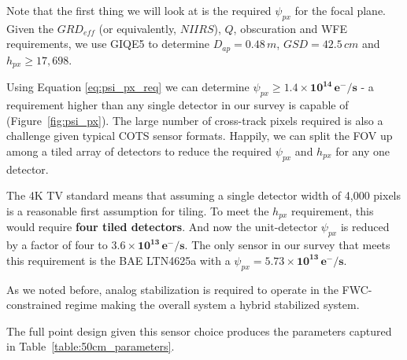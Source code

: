 \documentclass[]{spieman}  %
\begin{document}
Note that the first thing we will look at is the required $\psi_{px}$ for the focal plane.  Given the $GRD_{eff}$ (or equivalently, $NIIRS$), $Q$, obscuration and WFE requirements, we use GIQE5 to determine $D_{ap} = 0.48 \, m$, $GSD = 42.5 \, cm$ and $h_{px} \geq 17,698$.

Using Equation \eqref{eq:psi_px_req} we can determine $\psi_{px} \geq \mathbf{1.4 \times 10^{14} \, e^- / s}$ - a requirement higher than any single detector in our survey is capable of (Figure~\ref{fig:psi_px}).  The large number of cross-track pixels required is also a challenge given typical COTS sensor formats.  Happily, we can split the FOV up among a tiled array of detectors to reduce the required $\psi_{px}$ and $h_{px}$ for any one detector.  

The 4K TV standard means that assuming a single detector width of 4,000 pixels is a reasonable first assumption for tiling.  To meet the $h_{px}$ requirement, this would require \textbf{four tiled detectors}.  And now the unit-detector $\psi_{px}$ is reduced by a factor of four to $\mathbf{3.6 \times 10^{13} \, e^-/s}$.  The only sensor in our survey that meets this requirement is the BAE LTN4625a with a $\psi_{px} = \mathbf{5.73 \times 10^{13} \, e^- / s}$.

As we noted before, analog stabilization is required to operate in the FWC-constrained regime making the overall system a hybrid stabilized system.

The full point design given this sensor choice produces the parameters captured in Table~\ref{table:50cm_parameters}.

\begin{table}[h!]
\centering
{}
\caption{Dependent system parameters for optimized 50cm system}
\label{table:50cm_parameters}
\end{table}
\end{document}
